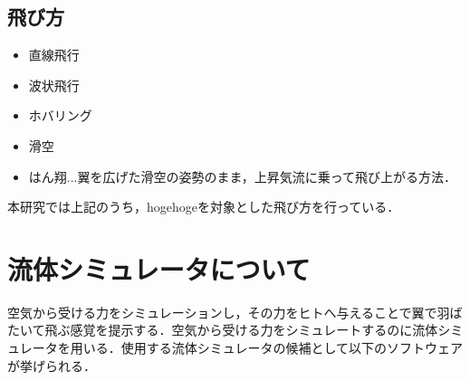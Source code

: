 
    \subsection{飛び方}
        \begin{itemize}
        \item 直線飛行
        \item 波状飛行
        \item ホバリング
        \item 滑空
        \item はん翔...翼を広げた滑空の姿勢のまま，上昇気流に乗って飛び上がる方法．
        \end{itemize}

        本研究では上記のうち，hogehogeを対象とした飛び方を行っている．


        \section{流体シミュレータについて} 
            空気から受ける力をシミュレーションし，その力をヒトへ与えることで翼で羽ばたいて飛ぶ感覚を提示する．空気から受ける力をシミュレートするのに流体シミュレータを用いる．使用する流体シミュレータの候補として以下のソフトウェアが挙げられる．
        
